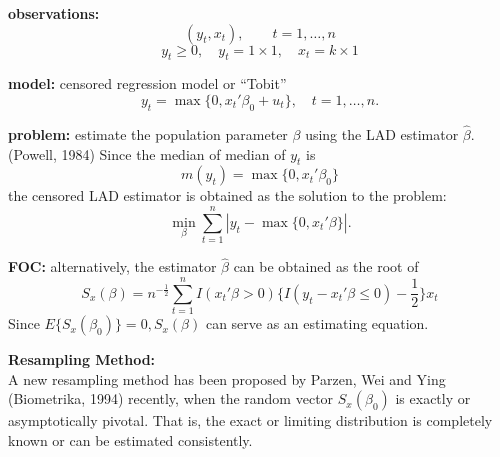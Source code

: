 \documentclass[12pt]{article}
\begin{document}
\noindent \textbf{observations:} 
\[
(y_t, x_t), \quad\quad      t = 1,\ldots, n 
\]
\[
y_t \ge 0, \quad y_t = 1\times 1, \quad  x_t = k\times 1
\]

\bigskip

\noindent \textbf{model:}  censored regression model or ``Tobit''
\[
y_t = \max \{0, x_t' \beta_0 + u_t\}, \quad   t = 1,\ldots, n. 
\]

\bigskip

\noindent \textbf{problem:}  estimate the population parameter 
$\beta$ using the LAD estimator
${\hat \beta}$.  (Powell, 1984)
Since the median of median of $y_t$ is 
\[
m(y_t) = \max\{0, x_t' \beta_0\}
\] 
the censored LAD estimator is obtained as the solution to the problem:
\[
\min_\beta\sum_{t=1} ^ n | y_t - \max \{0, x_t'\beta\} |.
\]

\bigskip

\noindent \textbf{FOC:}  alternatively, the estimator ${\hat \beta}$ 
can be obtained as the root of
\[
S_x (\beta) = n^{-\frac {1}{2}} \sum_{t=1}^n I(x_t' \beta > 0)\{I (y_t - x_t'
\beta\le 0) - \frac {1}{2}\} x_t
\]
Since $E\{S_x (\beta_0)\} = 0, S_x (\beta)$ can serve as an estimating
equation.

\noindent \textbf{Resampling Method:} \\
A new resampling method has been proposed by
Parzen, Wei and Ying (Biometrika, 1994) recently, when the random vector
$S_x(\beta_0)$ is exactly or asymptotically pivotal.  That is, the exact or
limiting distribution is completely known or can be estimated consistently.
\end{document}
